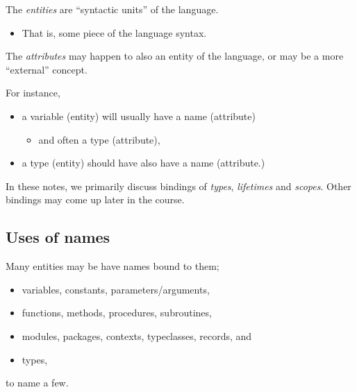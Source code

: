 \documentclass[11pt]{article}
\theoremstyle{definition}
\begin{document}
The \emph{entities} are “syntactic units” of the language.
\begin{itemize}
\item That is, some piece of the language syntax.
\end{itemize}

The \emph{attributes} may happen to also an entity of the language,
or may be a more “external” concept.

For instance,
\begin{itemize}
\item a variable (entity) will usually have a name (attribute)
\begin{itemize}
\item and often a type (attribute),
\end{itemize}
\item a type (entity) should have also have a name (attribute.)
\end{itemize}

In these notes, we primarily discuss bindings of \emph{types}, \emph{lifetimes} and \emph{scopes}.
Other bindings may come up later in the course.

\subsection{Uses of names}
\label{sec:orga5d15d9}
Many entities may be have names bound to them;
\begin{itemize}
\item variables, constants, parameters/arguments,
\item functions, methods, procedures, subroutines,
\item modules, packages, contexts, typeclasses, records, and
\item types,
\end{itemize}
to name a few.
\end{document}
